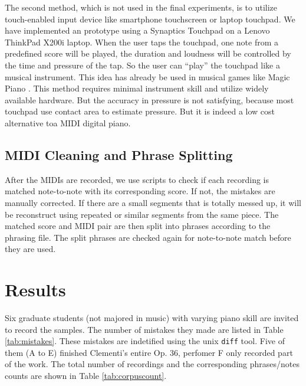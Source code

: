 The second method, which is not used in the final experiments, is to utilize touch-enabled input device like smartphone touchscreen or laptop touchpad. We have implemented an prototype using a Synaptics Touchpad on a Lenovo ThinkPad X200i laptop. When the user taps the touchpad, one note from a predefined score will be played, the duration and loudness will be controlled by the time and pressure of the tap. So the user can \enquote{play} the touchpad like a musical instrument. This idea has already be used in musical games like Magic Piano \cite{magicpiano}. This method requires minimal instrument skill and utilize widely available hardware. But the accuracy in pressure is not satisfying, because most touchpad use contact area to estimate pressure. But it is indeed a low cost alternative toa MIDI digital piano.

\subsection{MIDI Cleaning and Phrase Splitting}
  After the MIDIs are recorded, we use scripts to check if each recording is matched note-to-note with its corresponding score. If not, the mistakes are manually corrected. %
  If there are a small segments that is totally messed up, it will be reconstruct using repeated or similar segments from the same piece. The matched score and MIDI pair are then split into phrases according to the phrasing file. The split phrases are checked again for note-to-note match before they are used.

\section{Results}
Six graduate students (not majored in music) with varying piano skill are invited to record the samples. The number of mistakes they made are listed in Table \ref{tab:mistakes}. These mistakes are indetified using the unix \texttt{diff}\cite{diff} tool. Five of them (A to E) finished Clementi's entire Op. 36, perfomer F only recorded part of the work. The total number of recordings and the corresponding phrases/notes counts are shown in Table \ref{tab:corpuscount}. 


